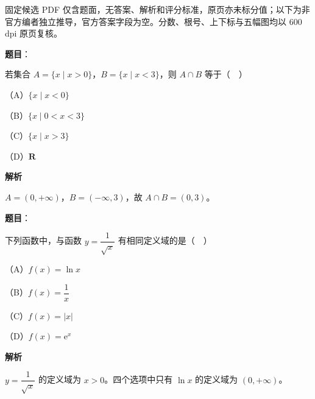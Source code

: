 

\begin{gktip}
固定候选 PDF 仅含题面，无答案、解析和评分标准，原页亦未标分值；以下为非官方编者独立推导，官方答案字段为空。分数、根号、上下标与五幅图均以 600 dpi 原页复核。
\end{gktip}

\begin{answer}

\textbf{题目}：

若集合 $A=\{x\mid x>0\}$，$B=\{x\mid x<3\}$，则 $A\cap B$ 等于（　）

（A）$\{x\mid x<0\}$

（B）$\{x\mid 0<x<3\}$

（C）$\{x\mid x>3\}$

（D）$\mathbf R$

\textbf{解析}

$A=(0,+\infty)$，$B=(-\infty,3)$，故 $A\cap B=(0,3)$。


\end{answer}
\begin{answer}

\textbf{题目}：

下列函数中，与函数 $y=\dfrac1{\sqrt x}$ 有相同定义域的是（　）

（A）$f(x)=\ln x$

（B）$f(x)=\dfrac1x$

（C）$f(x)=|x|$

（D）$f(x)=\mathrm e^x$

\textbf{解析}

$y=\dfrac1{\sqrt x}$ 的定义域为 $x>0$。四个选项中只有 $\ln x$ 的定义域为 $(0,+\infty)$。


\end{answer}
